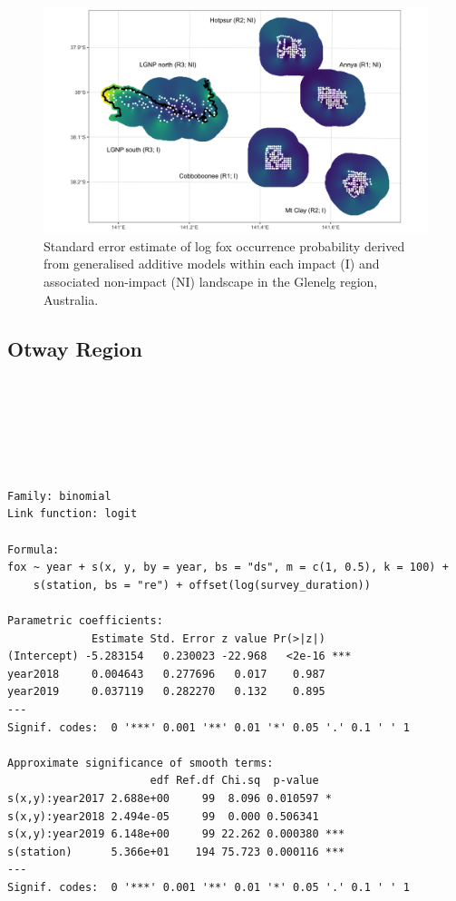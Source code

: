 \documentclass[11pt,a4paper,titlepage,twoside,openright]{style/unimelbthesis}
\begin{document}
\begin{mainmatter}
\begin{figure}
{\centering \includegraphics[width=1\linewidth]{figure/fox_occ_se_glenelg_600dpi} 

}

\caption{Standard error estimate of log fox occurrence probability derived from generalised additive models within each impact (I) and associated non-impact (NI) landscape in the Glenelg region, Australia.}\label{fig:density-fox-se-g}
\end{figure}
\newpage

\hypertarget{otway-region-1}{%
\subsection{Otway Region}\label{otway-region-1}}

\(~\)

\(~\)

\(~\)
\begin{verbatim}

Family: binomial 
Link function: logit 

Formula:
fox ~ year + s(x, y, by = year, bs = "ds", m = c(1, 0.5), k = 100) + 
    s(station, bs = "re") + offset(log(survey_duration))

Parametric coefficients:
             Estimate Std. Error z value Pr(>|z|)    
(Intercept) -5.283154   0.230023 -22.968   <2e-16 ***
year2018     0.004643   0.277696   0.017    0.987    
year2019     0.037119   0.282270   0.132    0.895    
---
Signif. codes:  0 '***' 0.001 '**' 0.01 '*' 0.05 '.' 0.1 ' ' 1

Approximate significance of smooth terms:
                      edf Ref.df Chi.sq  p-value    
s(x,y):year2017 2.688e+00     99  8.096 0.010597 *  
s(x,y):year2018 2.494e-05     99  0.000 0.506341    
s(x,y):year2019 6.148e+00     99 22.262 0.000380 ***
s(station)      5.366e+01    194 75.723 0.000116 ***
---
Signif. codes:  0 '***' 0.001 '**' 0.01 '*' 0.05 '.' 0.1 ' ' 1


\end{verbatim}
\end{mainmatter}
\end{document}

